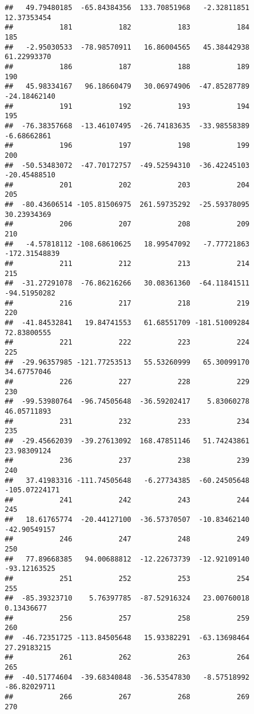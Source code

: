 \documentclass[
]{article}
\begin{document}
\begin{verbatim}
##   49.79480185  -65.84384356  133.70851968   -2.32811851   12.37353454 
##           181           182           183           184           185 
##   -2.95030533  -78.98570911   16.86004565   45.38442938   61.22993370 
##           186           187           188           189           190 
##   45.98334167   96.18660479   30.06974906  -47.85287789  -24.18462140 
##           191           192           193           194           195 
##  -76.38357668  -13.46107495  -26.74183635  -33.98558389   -6.68662861 
##           196           197           198           199           200 
##  -50.53483072  -47.70172757  -49.52594310  -36.42245103  -20.45488510 
##           201           202           203           204           205 
##  -80.43606514 -105.81506975  261.59735292  -25.59378095   30.23934369 
##           206           207           208           209           210 
##   -4.57818112 -108.68610625   18.99547092   -7.77721863 -172.31548839 
##           211           212           213           214           215 
##  -31.27291078  -76.86216266   30.08361360  -64.11841511  -94.51950282 
##           216           217           218           219           220 
##  -41.84532841   19.84741553   61.68551709 -181.51009284   72.83800555 
##           221           222           223           224           225 
##  -29.96357985 -121.77253513   55.53260999   65.30099170   34.67757046 
##           226           227           228           229           230 
##  -99.53980764  -96.74505648  -36.59202417    5.83060278   46.05711893 
##           231           232           233           234           235 
##  -29.45662039  -39.27613092  168.47851146   51.74243861   23.98309124 
##           236           237           238           239           240 
##   37.41983316 -111.74505648   -6.27734385  -60.24505648 -105.07224171 
##           241           242           243           244           245 
##   18.61765774  -20.44127100  -36.57370507  -10.83462140  -42.90549157 
##           246           247           248           249           250 
##   77.89668385   94.00688812  -12.22673739  -12.92109140  -93.12163525 
##           251           252           253           254           255 
##  -85.39323710    5.76397785  -87.52916324   23.00760018    0.13436677 
##           256           257           258           259           260 
##  -46.72351725 -113.84505648   15.93382291  -63.13698464   27.29183215 
##           261           262           263           264           265 
##  -40.51774604  -39.68340848  -36.53547830   -8.57518992  -86.82029711 
##           266           267           268           269           270 

\end{verbatim}
\end{document}
